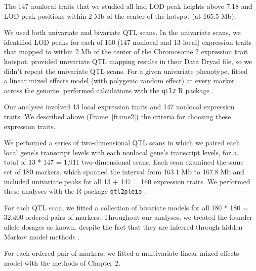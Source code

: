 \documentclass{book}
\begin{document}
The 147 nonlocal traits that we studied all had LOD peak heights above 7.18 and LOD peak positions within 2 Mb of the center of the hotspot (at 165.5 Mb).




We used both univariate and bivariate QTL scans. In the univariate scans, we identified LOD peaks for each of 160 (147 nonlocal and 13 local) expression traits that mapped to within 2 Mb of the center of the Chromosome 2 expression trait hotspot. \citet{keller2018genetic} provided univariate QTL mapping results in their Data Dryad file, so we didn't repeat the univariate QTL scans. For a given univariate phenotype, \citet{keller2018genetic} fitted a linear mixed effects model (with polygenic random effect) at every marker across the genome. \citet{keller2018genetic} performed calculations with the \texttt{qtl2} R package \citep{broman2019rqtl2}.




Our analyses involved 13 local expression traits and 147 nonlocal expression traits. We described above (Frame~\ref{frame2}) the criteria for choosing these expression traits.

We performed a series of two-dimensional QTL scans in which we paired each local gene's transcript levels with each nonlocal gene's transcript levels, for a total of 13 * 147 = 1,911 two-dimensional scans. Each scan examined the same set of 180 markers, which spanned the interval from 163.1 Mb to 167.8 Mb and included univariate peaks for all 13 + 147 = 160 expression traits. We performed these analyses with the R package \texttt{qtl2pleio} \citep{qtl2pleio}.

For each QTL scan, we fitted a collection of bivariate models for all 180 * 180 = 32,400 ordered pairs of markers. Throughout our analyses, we treated the founder allele dosages as known, despite the fact that they are inferred through hidden Markov model methods \citep{broman2012genotype, broman2012haplotype, broman2019rqtl2}.

For each ordered pair of markers, we fitted a multivariate linear mixed effects model with the methods of Chapter 2.
\end{document}
